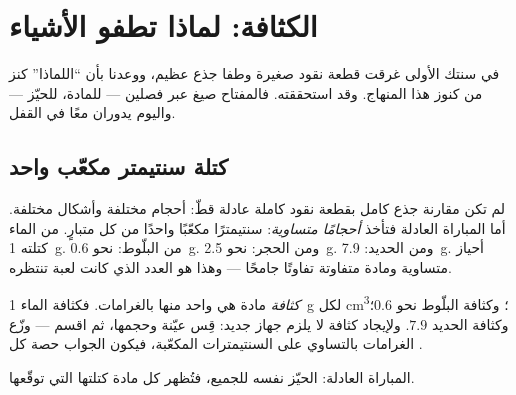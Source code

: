 \chapter{الكثافة: لماذا تطفو الأشياء}\label{ch:g6:density-floating}

في سنتك الأولى غرقت قطعة نقود صغيرة وطفا جذع عظيم، ووعدنا بأن
``اللماذا'' كنز من كنوز هذا المنهاج. وقد استحققته. فالمفتاح
صيغ عبر فصلين ---  للمادة،  للحيّز --- واليوم
يدوران معًا في القفل.

\section{كتلة سنتيمتر مكعّب واحد}

\begin{example}\label{ex:g6:density-floating:fair}
لم تكن مقارنة جذع كامل بقطعة نقود كاملة عادلة قطّ: أحجام
مختلفة وأشكال مختلفة. أما المباراة العادلة فتأخذ \emph{أحجامًا
متساوية}: سنتيمترًا مكعّبًا واحدًا من كل متبارٍ. 
من الماء كتلته \qty{1}{g}.  من البلّوط: نحو
\qty{0.6}{g}. ومن الحجر: نحو \qty{2.5}{g}. ومن الحديد:
\qty{7.9}{g}. أحياز متساوية ومادة متفاوتة تفاوتًا جامحًا ---
وهذا هو العدد الذي كانت لعبة  تنتظره.
\end{example}

\begin{definition}[الكثافة]\label{def:g6:density-floating:density}
\emph{كثافة} مادة هي   واحد منها
بالغرامات. فكثافة الماء \qty{1}{g} لكل \unit{cm^3}؛ وكثافة
البلّوط نحو $0.6$؛ وكثافة الحديد $7.9$. ولإيجاد كثافة لا يلزم
جهاز جديد: قِس  عيّنة وحجمها، ثم اقسم --- وزّع الغرامات
بالتساوي على السنتيمترات المكعّبة، فيكون الجواب حصة كل
.
\end{definition}

\begin{omfigure}

{\small المباراة العادلة: الحيّز نفسه للجميع، فتُظهر كل مادة
كتلتها التي توقّعها.}
\end{omfigure}


